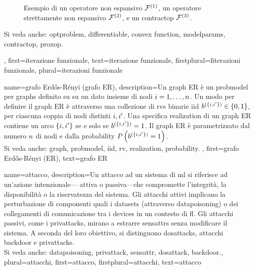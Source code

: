 {{\begin{figure}[H]
\begin{center}
			\end{center} 
			\caption{Esempio di un operatore non espansivo $\mathcal{F}^{(1)}$, un operatore strettamente non espansivo $\mathcal{F}^{(2)}$, e 
				un \gls{contractop} $\mathcal{F}^{(3)}$. \label{fig_examples_nonexp_dict}}
		\end{figure} 
		Si veda anche: \gls{optproblem}, \gls{differentiable}, \gls{convex} \gls{function}, \glspl{modelparam}, \gls{contractop}, \gls{proxop}.
	},
	first={iterazione funzionale},
	text={iterazione funzionale},
	firstplural={fiterazioni funzionale}, 
	plural={iterazioni funzionale}
}


{name={grafo Erd\H{o}s-R\'enyi (grafo ER)},
	description={Un \gls{graph} ER è un \gls{probmodel} per \glspl{graph} definito su 
		su un dato insieme di nodi $i=1,\ldots,n$. Un modo per definire il \gls{graph} ER è 
		attraverso una collezione di \glspl{rv} binarie \gls{iid} $b^{(\{i,i'\})} \in \{0,1\}$, 
		per ciascuna coppia di nodi distinti $i, i'$. Una specifica \gls{realization}  
		di un \gls{graph} ER contiene un arco $\{i,i'\}$ se e solo se 
		$b^{(\{i,i'\})}=1$. Il \gls{graph} ER è parametrizzato dal 
		numero $n$ di nodi e dalla \gls{probability} $P\left(b^{(\{i,i'\})}=1\right)$. 
		\\
		Si veda anche: \gls{graph}, \gls{probmodel}, \gls{iid}, \gls{rv}, \gls{realization}, \gls{probability}.
	},
	first={grafo Erd\H{o}s-R\'enyi (ER)},
	text={grafo ER}
}

{name={attacco},  
	description={Un attacco ad un sistema di \gls{ml} si riferisce ad un'azione intenzionale— 
		attiva o passiva—che compromette l'integrità, la disponibilità o la riservatezza del sistema.
		Gli attacchi attivi implicano la perturbazione di componenti quali i \glspl{dataset} (attraverso \gls{datapoisoning}) 
		o dei collegamenti di comunicazione tra i \glspl{device} in un contesto di \gls{fl}. Gli attacchi passivi, 
		come i \glspl{privattack}, mirano a estrarre \glspl{sensattr} senza modificare il sistema. 
		A seconda del loro obiettivo, si distinguono \glspl{dosattack}, attacchi \gls{backdoor} e \glspl{privattack}.
		\\
		Si veda anche:  \gls{datapoisoning}, \gls{privattack}, \gls{sensattr}, \gls{dosattack}, \gls{backdoor}.},
	plural={attacchi}, 
	first={attacco},
	firstplural={attacchi},
	text={attacco}
}

